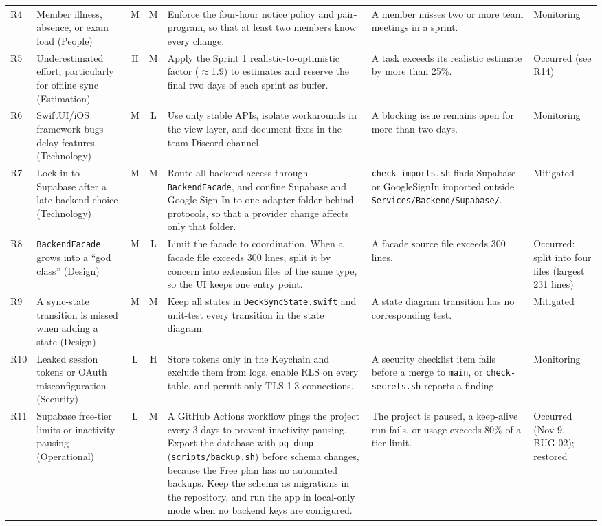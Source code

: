 \documentclass[12pt,letterpaper]{article}
\begin{document}
\begin{xltabular}{\textwidth}{@{}l L{3.0cm} c c Y L{2.9cm} L{1.7cm}@{}}
R4 & Member illness, absence, or exam load (People) & M & M & Enforce the four-hour notice policy and pair-program, so that at least two members know every change. & A member misses two or more team meetings in a sprint. & Monitoring \\
R5 & Underestimated effort, particularly for offline sync (Estimation) & H & M & Apply the Sprint 1 realistic-to-optimistic factor ($\approx$1.9) to estimates and reserve the final two days of each sprint as buffer. & A task exceeds its realistic estimate by more than 25\%. & Occurred (see R14) \\
R6 & SwiftUI/iOS framework bugs delay features (Technology) & M & L & Use only stable APIs, isolate workarounds in the view layer, and document fixes in the team Discord channel. & A blocking issue remains open for more than two days. & Monitoring \\
R7 & Lock-in to Supabase after a late backend choice (Technology) & M & M & Route all backend access through \texttt{BackendFacade}, and confine Supabase and Google Sign-In to one adapter folder behind protocols, so that a provider change affects only that folder. & \texttt{check-imports.sh} finds Supabase or GoogleSignIn imported outside \texttt{Services/\allowbreak Backend/\allowbreak Supabase/}. & Mitigated \\
R8 & \texttt{BackendFacade} grows into a ``god class'' (Design) & M & L & Limit the facade to coordination. When a facade file exceeds 300 lines, split it by concern into extension files of the same type, so the UI keeps one entry point. & A facade source file exceeds 300 lines. & Occurred: split into four files (largest 231 lines) \\
R9 & A sync-state transition is missed when adding a state (Design) & M & M & Keep all states in \texttt{DeckSyncState.swift} and unit-test every transition in the state diagram. & A state diagram transition has no corresponding test. & Mitigated \\
R10 & Leaked session tokens or OAuth misconfiguration (Security) & L & H & Store tokens only in the Keychain and exclude them from logs, enable RLS on every table, and permit only TLS 1.3 connections. & A security checklist item fails before a merge to \texttt{main}, or \texttt{check-secrets.sh} reports a finding. & Monitoring \\
R11 & Supabase free-tier limits or inactivity pausing (Operational) & L & M & A GitHub Actions workflow pings the project every 3 days to prevent inactivity pausing. Export the database with \texttt{pg\_dump} (\texttt{scripts/backup.sh}) before schema changes, because the Free plan has no automated backups. Keep the schema as migrations in the repository, and run the app in local-only mode when no backend keys are configured. & The project is paused, a keep-alive run fails, or usage exceeds 80\% of a tier limit. & Occurred (Nov 9, BUG-02); restored \\

\end{xltabular}
\end{document}
